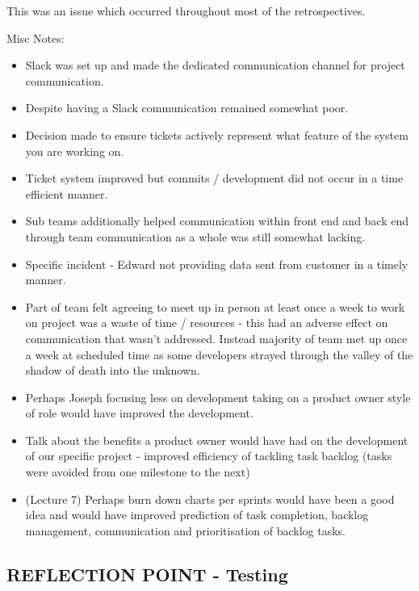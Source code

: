 \documentclass{l3proj}
\begin{document}
This was an issue which occurred throughout most of the retrospectives.

Misc Notes:
\begin{itemize}
\item Slack was set up and made the dedicated communication channel for project communication.
\item Despite having a Slack communication remained somewhat poor.
\item Decision made to ensure tickets actively represent what feature of the system you are working on.
\item Ticket system improved but commits / development did not occur in a time efficient manner.
\item Sub teams additionally helped communication within front end and back end through team communication as a whole was still somewhat lacking.
\item Specific incident - Edward not providing data sent from customer in a timely manner.
\item Part of team felt agreeing to meet up in person at least once a week to work on project was a waste of time / resources - this had an adverse effect on communication that wasn’t addressed. Instead majority of team met up once a week at scheduled time as some developers strayed through the valley of the shadow of death into the unknown.
\item Perhaps Joseph focusing less on development taking on a product owner style of role would have improved the development.
\item Talk about the benefits a product owner would have had on the development of our specific project - improved efficiency of tackling task backlog (tasks were avoided from one milestone to the next)
\item (Lecture 7) Perhaps burn down charts per sprints would have been a good idea and would have improved prediction of task completion, backlog management, communication and prioritisation of backlog tasks.
\end{itemize}


\subsection{REFLECTION POINT - Testing}
\label{testing}
\end{document}
